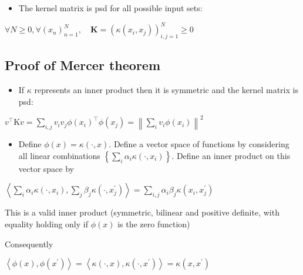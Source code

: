 \begin{itemize}
  \item The kernel matrix is psd for all possible input sets:
\end{itemize}

$
\forall N \geq 0, \forall\left(x_{n}\right)_{n=1}^{N}, \quad \mathbf{K}=\left(\kappa\left(x_{i}, x_{j}\right)\right)_{i, j=1}^{N} \geqslant 0
$

\subsection*{Proof of Mercer theorem}
\begin{itemize}
  \item If $\kappa$ represents an inner product then it is symmetric and the kernel matrix is psd:
\end{itemize}

$
v^{\top} \mathrm{K} v=\sum_{i, j} v_{i} v_{j} \phi\left(x_{i}\right)^{\top} \phi\left(x_{j}\right)=\left\|\sum_{i} v_{i} \phi\left(x_{i}\right)\right\|^{2}
$

\begin{itemize}
  \item Define $\phi(x)=\kappa(\cdot, x)$. Define a vector space of functions by considering all linear combinations $\left\{\sum_{i} \alpha_{i} \kappa\left(\cdot, x_{i}\right)\right\}$. Define an inner product on this vector space by
\end{itemize}

$
\left\langle\sum_{i} \alpha_{i} \kappa\left(\cdot, x_{i}\right), \sum_{j} \beta_{j} \kappa\left(\cdot, x_{j}^{\prime}\right)\right\rangle=\sum_{i, j} \alpha_{i} \beta_{j} \kappa\left(x_{i}, x_{j}^{\prime}\right)
$

This is a valid inner product (symmetric, bilinear and positive definite, with equality holding only if $\phi(x)$ is the zero function)

Consequently

$
\left\langle\phi(x), \phi\left(x^{\prime}\right)\right\rangle=\left\langle\kappa(\cdot, x), \kappa\left(\cdot, x^{\prime}\right)\right\rangle=\kappa\left(x, x^{\prime}\right)
$
